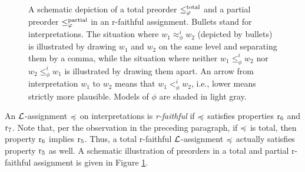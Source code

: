 \begin{figure}\centering
	\caption{
		A schematic depiction of a total preorder $\le^{\mathrm{total}}_{\varphi}$ 
		and a partial preorder $\le^{\mathrm{partial}}_{\varphi}$
		in an r-faithful assignment.
		Bullets stand for interpretations.
		The situation where $w_1\approx^i_\phi w_2$ 
		(depicted by bullets) is illustrated by drawing 
		$w_1$ and $w_2$ on the same level and separating them by a comma,
		while the situation where neither 
		$w_1\le^i_\phi w_2$ nor $w_2\le^i_\phi w_1$ 
		is illustrated by drawing them apart.
		An arrow from interpretation $w_1$ to $w_2$ means that $w_1<^i_\phi w_2$, i.e., lower means strictly more plausible.
		Models of $\phi$ are shaded in light gray. 
	}
	\label{fig:3-revision-rfaithful-schematic}
\end{figure}

An $\mathcal{L}$-assignment $\preccurlyeq$ on interpretations is \emph{r-faithful} if 
$\preccurlyeq$ satisfies properties $\mathrm{r}_{6}$ and $\mathrm{r}_{7}$.
Note that, per the observation in the preceding paragraph, 
if $\preccurlyeq$ is total, then property $\mathrm{r}_{6}$ implies $\mathrm{r}_{5}$.
Thus, a total r-faithful $\mathcal{L}$-assignment $\preccurlyeq$ actually satisfies
property $\mathrm{r}_{5}$ as well.
A schematic illustration of preorders in a total and partial r-faithful 
assignment is given in Figure \ref{fig:3-revision-rfaithful-schematic}.

